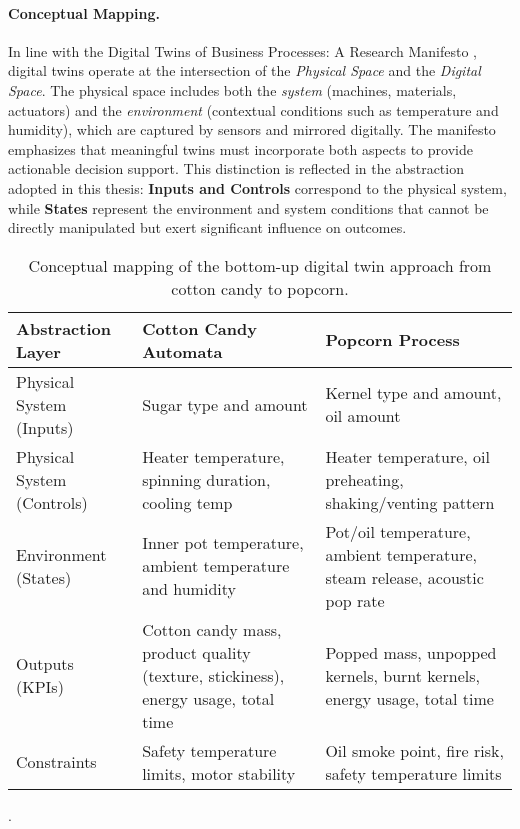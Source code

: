 \paragraph{Conceptual Mapping.}
In line with the Digital Twins of Business Processes: A Research Manifesto \cite{FORNARI2025101477}, digital twins operate at the intersection of the \textit{Physical Space} and the \textit{Digital Space}. The physical space includes both the \textit{system} (machines, materials, actuators) and the \textit{environment} (contextual conditions such as temperature and humidity), which are captured by sensors and mirrored digitally. The manifesto emphasizes that meaningful twins must incorporate both aspects to provide actionable decision support. This distinction is reflected in the abstraction adopted in this thesis: \textbf{Inputs and Controls} correspond to the physical system, while \textbf{States} represent the environment and system conditions that cannot be directly manipulated but exert significant influence on outcomes.

\begin{table}[h!]
  \begin{center}
    \caption{Conceptual mapping of the bottom-up digital twin approach from cotton candy to popcorn.}
    \label{tab:transferability}
    \begin{tabular}{p{3.5cm}|p{5cm}|p{5cm}}
      \textbf{Abstraction Layer} & \textbf{Cotton Candy Automata} & \textbf{Popcorn Process} \\
      \hline
      Physical System (Inputs) & Sugar type and amount & Kernel type and amount, oil amount \\
      Physical System (Controls) & Heater temperature, spinning duration, cooling temp & Heater temperature, oil preheating, shaking/venting pattern \\
      Environment (States) & Inner pot temperature, ambient temperature and humidity & Pot/oil temperature, ambient temperature, steam release, acoustic pop rate \\
      Outputs (KPIs) & Cotton candy mass, product quality (texture, stickiness), energy usage, total time & Popped mass, unpopped kernels, burnt kernels, energy usage, total time \\
      Constraints & Safety temperature limits, motor stability & Oil smoke point, fire risk, safety temperature limits \\
    \end{tabular}
  \end{center}
  .
\end{table}
    
